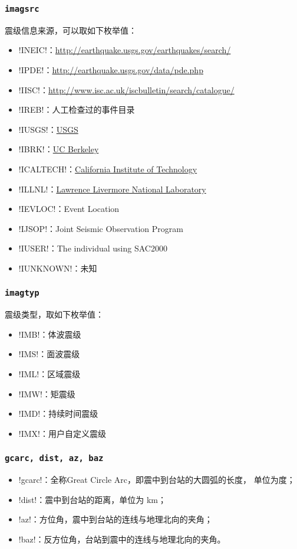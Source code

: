 \subsubsection{\texttt{imagsrc}}
震级信息来源，可以取如下枚举值：
\begin{itemize}
\item !INEIC!：\url{http://earthquake.usgs.gov/earthquakes/search/}
\item !IPDE!：\url{http://earthquake.usgs.gov/data/pde.php}
\item !IISC!：\url{http://www.isc.ac.uk/iscbulletin/search/catalogue/}
\item !IREB!：人工检查过的事件目录
\item !IUSGS!：\href{http://earthquake.usgs.gov}{USGS}
\item !IBRK!：\href{http://seismo.berkeley.edu/}{UC Berkeley}
\item !ICALTECH!：\href{http://www.seismolab.caltech.edu}{California Institute of Technology}
\item !ILLNL!：\href{https://www.llnl.gov/}{Lawrence Livermore National Laboratory}
\item !IEVLOC!：Event Location
\item !IJSOP!：Joint Seismic Observation Program
\item !IUSER!：The individual using SAC2000
\item !IUNKNOWN!：未知
\end{itemize}

\subsubsection{\texttt{imagtyp}}
震级类型，取如下枚举值：
\begin{itemize}
\item !IMB!：体波震级
\item !IMS!：面波震级
\item !IML!：区域震级
\item !IMW!：矩震级
\item !IMD!：持续时间震级
\item !IMX!：用户自定义震级
\end{itemize}

\subsubsection{\texttt{gcarc, dist, az, baz}}
\begin{itemize}
\item !gcarc!：全称Great Circle Arc，即震中到台站的大圆弧的长度，
    单位为度；
\item !dist!：震中到台站的距离，单位为 \si{\km}；
\item !az!：方位角，震中到台站的连线与地理北向的夹角；
\item !baz!：反方位角，台站到震中的连线与地理北向的夹角。
\end{itemize}

